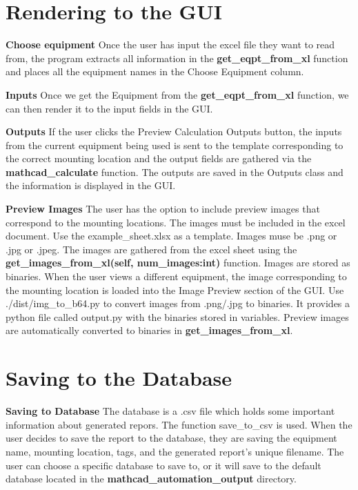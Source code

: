 \documentclass[11pt]{article}
\begin{document}
\section{Rendering to the GUI}
\label{sec:org4440a59}
\textbf{Choose equipment}
    Once the user has input the excel file they want to read from, the program extracts all information in the \textbf{get\_eqpt\_from\_xl} function and places all the equipment names in the Choose Equipment column.

\textbf{Inputs}
    Once we get the Equipment from the \textbf{get\_eqpt\_from\_xl} function, we can then render it to the input fields in the GUI.

\textbf{Outputs}
    If the user clicks the Preview Calculation Outputs button, the inputs from the current equipment being used is sent to the template corresponding to the correct mounting location and the output fields are gathered via the \textbf{mathcad\_calculate} function. The outputs are saved in the Outputs class and the information is displayed in the GUI.

\textbf{Preview Images}
    The user has the option to include preview images that correspond to the mounting locations. The images must be included in the excel document. Use the example\_sheet.xlsx as a template. Images muse be .png or .jpg or .jpeg. The images are gathered from the excel sheet using the \textbf{get\_images\_from\_xl(self, num\_images:int)} function. Images are stored as binaries. When the user views a different equipment, the image corresponding to the mounting location is loaded into the Image Preview section of the GUI. Use ./dist/img\_to\_b64.py to convert images from .png/.jpg to binaries. It provides a python file called output.py with the binaries stored in variables. Preview images are automatically converted to binaries in \textbf{get\_images\_from\_xl}.

\section{Saving to the Database}
\label{sec:org1ed8f59}

\textbf{Saving to Database}
    The database is a .csv file which holds some important information about generated repors. The function save\_to\_csv is used. When the user decides to save the report to the database, they are saving the equipment name, mounting location, tags, and the generated report's unique filename. The user can choose a specific database to save to, or it will save to the default database located in the \textbf{mathcad\_automation\_output} directory.
\end{document}
